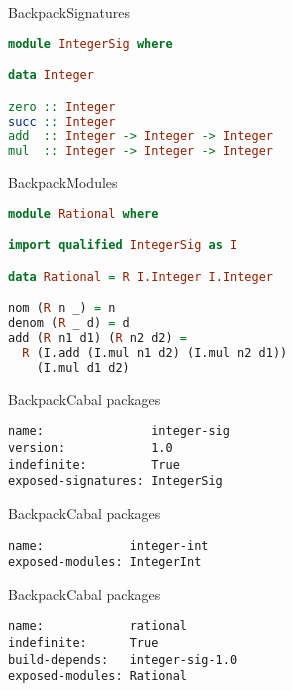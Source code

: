\documentclass{beamer}
\begin{document}
\begin{frame}[fragile]{Backpack}{Signatures}
\begin{lstlisting}[language=Haskell]
module IntegerSig where

data Integer

zero :: Integer
succ :: Integer
add  :: Integer -> Integer -> Integer
mul  :: Integer -> Integer -> Integer
\end{lstlisting}
\end{frame}

\begin{frame}[fragile]{Backpack}{Modules}
\begin{lstlisting}[language=Haskell]
module Rational where

import qualified IntegerSig as I

data Rational = R I.Integer I.Integer

nom (R n _) = n
denom (R _ d) = d
add (R n1 d1) (R n2 d2) =
  R (I.add (I.mul n1 d2) (I.mul n2 d1))
    (I.mul d1 d2)
\end{lstlisting}
\end{frame}

\begin{frame}[fragile]{Backpack}{Cabal packages}
\begin{lstlisting}[language=Cabal,title=Integer signature package]
name:               integer-sig
version:            1.0
indefinite:         True
exposed-signatures: IntegerSig
\end{lstlisting}
\end{frame}

\begin{frame}[fragile]{Backpack}{Cabal packages}
\begin{lstlisting}[language=Cabal,title=Integer implementation package]
name:            integer-int
exposed-modules: IntegerInt
\end{lstlisting}
\end{frame}

\begin{frame}[fragile]{Backpack}{Cabal packages}
\begin{lstlisting}[language=Cabal,title=Rational ``functor'' package]
name:            rational
indefinite:      True
build-depends:   integer-sig-1.0
exposed-modules: Rational
\end{lstlisting}
\end{frame}
\end{document}
